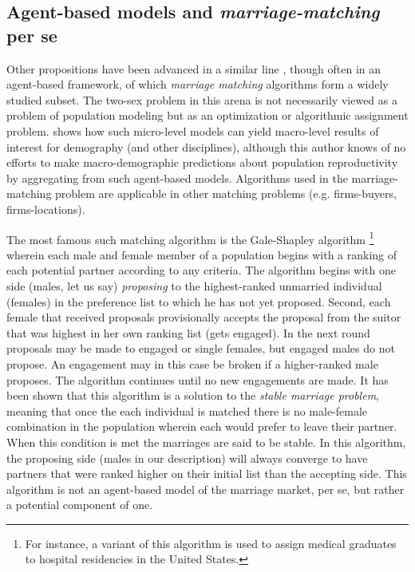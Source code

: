 \subsection{Agent-based models and \textit{marriage-matching} per se} 
Other
propositions have been advanced in a similar line \citep{jacquemet2011marriage,
Dagsvik1998report}, though often in an agent-based framework, of which \textit{marriage matching}
 algorithms form a widely studied subset. The two-sex problem in this
arena is not necessarily viewed as a problem of population modeling but as an
optimization or algorithmic assignment problem. \citet{dagsvik2000aggregation}
shows how such micro-level models can yield macro-level results of interest for
demography (and other disciplines), although this author knows of no efforts to
make macro-demographic predictions about population reproductivity by
aggregating from such agent-based models. Algorithms used in 
the marriage-matching problem are applicable in other matching problems (e.g.
firms-buyers, firms-locations). 

The most famous such matching algorithm is
the Gale-Shapley algorithm \citep{gale1962college}\footnote{For instance, a 
variant of this algorithm is used 
to assign medical graduates to hospital residencies in the United States.}
wherein each male and female member of a population begins with a ranking of
each potential partner according to any criteria. The algorithm begins with one
side (males, let us say) \textit{proposing} to the
highest-ranked unmarried individual (females) in the preference list to which
he has not yet proposed. Second, each female that received proposals
provisionally accepts the proposal from the suitor that was highest in her own
ranking list (gets engaged). In the next round proposals may be made to engaged
or single females, but engaged males do not propose. An engagement may in this
case be broken if a higher-ranked male proposes. The algorithm continues until
no new engagements are made. It has been shown that this algorithm is a solution
to the \textit{stable marriage problem}, meaning that once the each individual
is matched there is no male-female combination in the population wherein each
would prefer to leave their partner. When this condition is met the marriages
are said to be stable. In this algorithm, the proposing side (males in our
description) will always converge to have partners that were ranked higher on
their initial list than the accepting side. This algorithm is not an agent-based
model of the marriage market, per se, but rather a potential component of one.

